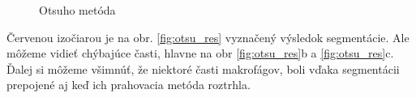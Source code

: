 \documentclass[a4paper,12pt,twoside]{article}%
\begin{document}
\begin{figure}[H]
    \hspace{5px}
    \caption{Otsuho metóda}
    \label{fig:otsu}
\end{figure}

Červenou izočiarou je na obr. \ref{fig:otsu_res} vyznačený výsledok segmentácie. Ale môžeme vidieť chýbajúce časti, hlavne na  obr \ref{fig:otsu_res}b a \ref{fig:otsu_res}c. Ďalej si môžeme všimnúť, že niektoré časti makrofágov, boli vďaka segmentácii prepojené aj keď ich prahovacia metóda roztrhla.
\end{document}

